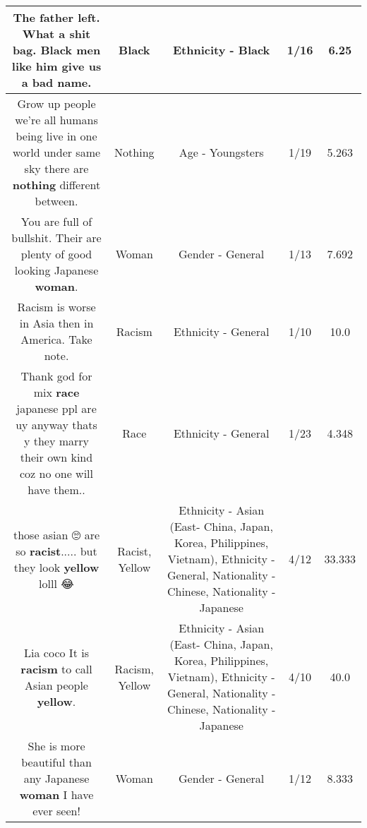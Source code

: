 \documentclass[11pt]{article}
\newlength\mylength
\begin{document}
\begin{center}
\begin{longtable}{|C{.65\mylength}|C{.30\mylength}|C{.12\mylength}|C{.12\mylength}|C{.12\mylength}|}
  \small The father left. What a shit bag. \textbf{Black} men like him give us a bad name.\normalsize   & Black & Ethnicity - Black & 1/16 & 6.25 \\  \hline
  \small Grow up people we're all humans being live in one world under same sky there are \textbf{nothing}  different between.\normalsize   & Nothing & Age - Youngsters & 1/19 & 5.263 \\  \hline
  \small You are full of bullshit. Their are plenty of good looking Japanese \textbf{woman}.\normalsize   & Woman & Gender - General & 1/13 & 7.692 \\  \hline
  \small Racism is worse in Asia then in America. Take note.\normalsize   & Racism & Ethnicity - General & 1/10 & 10.0 \\  \hline
  \small Thank god for mix \textbf{race} japanese ppl are uy anyway  thats y they marry their own kind coz no one will have them..\normalsize   & Race & Ethnicity - General & 1/23 & 4.348 \\  \hline
  \small those asian 🙄 are so \textbf{racist}..... but they look \textbf{y\textbf{e\textbf{llow}}} lolll 😂\normalsize   & Racist, Yellow & Ethnicity - Asian (East- China, Japan, Korea, Philippines, Vietnam), Ethnicity - General, Nationality - Chinese, Nationality - Japanese & 4/12 & 33.333 \\  \hline
  \small Lia coco It is \textbf{racism} to call Asian people \textbf{y\textbf{e\textbf{llow}}}.\normalsize   & Racism, Yellow & Ethnicity - Asian (East- China, Japan, Korea, Philippines, Vietnam), Ethnicity - General, Nationality - Chinese, Nationality - Japanese & 4/10 & 40.0 \\  \hline
  \small She is more beautiful than any Japanese \textbf{woman} I have ever seen!\normalsize   & Woman & Gender - General & 1/12 & 8.333 \\  \hline

\end{longtable}
\end{center}
\end{document}
